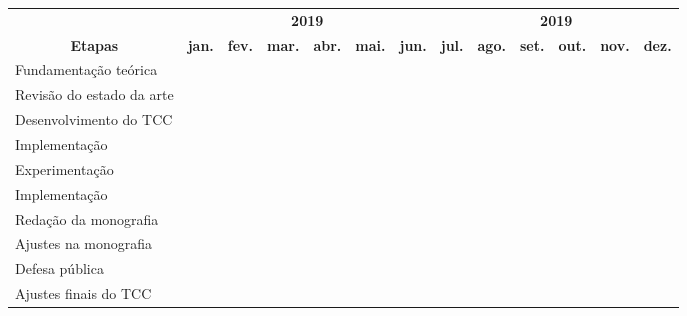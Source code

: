 \documentclass[11pt]{letter}
\begin{document}
\begin{center}
	\begin{tabular}{|p{4.04cm}|*{12}{c|}}
		\hline & \multicolumn{6}{c|}{\textbf{2019}}
			& \multicolumn{6}{c|}{\textbf{2019}} \\ \cline{2-13}
		\multicolumn{1}{|c|}{\multirow{-2}{*}{\textbf{Etapas}}}
			& \textbf{jan.} & \textbf{fev.} & \textbf{mar.}
			& \textbf{abr.} & \textbf{mai.} & \textbf{jun.}
			& \textbf{jul.} & \textbf{ago.} & \textbf{set.}
			& \textbf{out.} & \textbf{nov.} & \textbf{dez.} \\
		\hline Fundamentação teórica
			& \cellcolor{lightgray} & & & & & & & & & & & \\
		\hline Revisão do estado da arte
			& \cellcolor{lightgray} & \cellcolor{lightgray}
			& \cellcolor{lightgray} & & & & & & & & & \\
			\hline Desenvolvimento do TCC
			& & & \cellcolor{lightgray} & \cellcolor{lightgray}
			& \cellcolor{lightgray} & & & & & & & \\
		\hline Implementação
			& & & & & \cellcolor{lightgray} & \cellcolor{lightgray}
			& & & & & & \\
		\hline Experimentação
			& & & & & & & \cellcolor{lightgray} & & & & & \\
		\hline Implementação
			& & & & & & & & \cellcolor{lightgray} & & & & \\
		\hline Redação da monografia
			& & & & & & & & \cellcolor{lightgray} & \cellcolor{lightgray}
			& \cellcolor{lightgray} & & \\
		\hline Ajustes na monografia
			& & & & & & & & & & \cellcolor{lightgray} & \cellcolor{lightgray}
			& \\
		\hline Defesa pública
			& & & & & & & & & & & \cellcolor{lightgray} & \\
		\hline Ajustes finais do TCC
			& & & & & & & & & & & & \cellcolor{lightgray} \\
		\hline
	\end{tabular}

	\vspace*{\fill}
\end{center}
\end{document}
